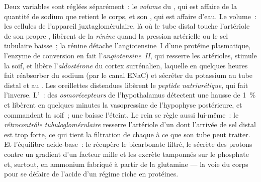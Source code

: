 \begin{definition}\label{def:b3:renal-osmoregulation:controls}
Deux variables sont réglées séparément~: le \emph{volume} du , qui est affaire de la quantité de sodium que retient le
corps, et son \emph{}, qui est affaire d'eau. Le volume~: les
cellules de l'appareil juxtaglomérulaire, là où le tube distal touche
l'artériole de son propre , libèrent de la \emph{rénine} quand
la pression artérielle ou le sel tubulaire baisse~; la rénine détache
l'angiotensine~I d'une protéine plasmatique, l'enzyme de conversion en
fait l'\emph{angiotensine~II}, qui resserre les artérioles, stimule la
soif, et libère l'\emph{aldostérone} du cortex surrénalien, laquelle en
quelques heures fait réabsorber du sodium (par le canal ENaC) et sécréter
du potassium au tube distal et au . Les oreillettes
distendues libèrent le \emph{peptide natriurétique}, qui fait l'inverse.
L'~: des \emph{osmorécepteurs} de l'hypothalamus détectent une
hausse de \qty{1}{\%} et libèrent en quelques minutes la vasopressine de
l'hypophyse postérieure, et commandent la soif~; une baisse l'éteint. Le
rein se règle aussi lui-même~: le \emph{rétrocontrôle tubuloglomérulaire}
resserre l'artériole d'un  dont l'arrivée de sel distal est trop
forte, ce qui tient la filtration de chaque  à ce que son tube
peut traiter. Et l'équilibre acide-base~: le  récupère le
bicarbonate filtré, le  sécrète des protons contre un
gradient d'un facteur mille et les excrète tamponnés sur le phosphate
et, surtout, en ammonium fabriqué à partir de la glutamine --- la voie du
corps pour se défaire de l'acide d'un régime riche en protéines.
\end{definition}

